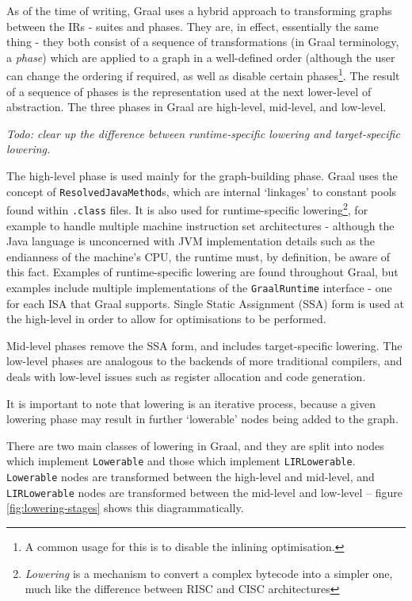 As of the time of writing, Graal uses a hybrid approach to transforming graphs between the IRs - suites and phases. They are, in effect, essentially the same thing - they both consist of a sequence of transformations (in Graal terminology, a \textit{phase}) which are applied to a graph in a well-defined order (although the user can change the ordering if required, as well as disable certain phases\footnote{A common usage for this is to disable the inlining optimisation.}. The result of a sequence of phases is the representation used at the next lower-level of abstraction. The three phases in Graal are high-level, mid-level, and low-level.

{\small \textit{Todo: clear up the difference between runtime-specific lowering and target-specific lowering.}}

The high-level phase is used mainly for the graph-building phase. Graal uses the concept of \texttt{ResolvedJavaMethod}s, which are internal `linkages' to constant pools found within \texttt{.class} files. It is also used for runtime-specific lowering\footnote{\emph{Lowering} is a mechanism to convert a complex bytecode into a simpler one, much like the difference between RISC and CISC architectures}, for example to handle multiple machine instruction set architectures - although the Java language is unconcerned with JVM implementation details such as the endianness of the machine's CPU, the runtime must, by definition, be aware of this fact. Examples of runtime-specific lowering are found throughout Graal, but examples include multiple implementations of the \texttt{GraalRuntime} interface - one for each ISA that Graal supports. Single Static Assignment (SSA) form is used at the high-level in order to allow for optimisations to be performed.

Mid-level phases remove the SSA form, and includes target-specific lowering. The low-level phases are analogous to the backends of more traditional compilers, and deals with low-level issues such as register allocation and code generation.

It is important to note that lowering is an iterative process, because a given lowering phase may result in further `lowerable' nodes being added to the graph.

There are two main classes of lowering in Graal, and they are split into nodes which implement \texttt{Lowerable} and those which implement \texttt{LIRLowerable}. \texttt{Lowerable} nodes are transformed between the high-level and mid-level, and \texttt{LIRLowerable} nodes are transformed between the mid-level and low-level -- figure \ref{fig:lowering-stages} shows this diagrammatically.

